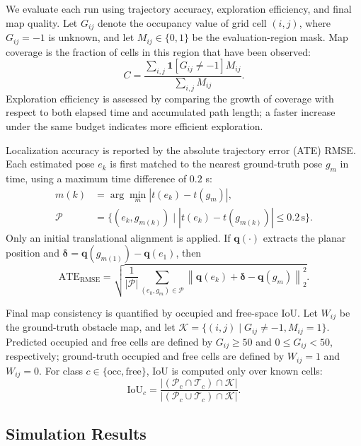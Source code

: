 \documentclass[conference]{IEEEtran}
\begin{document}
We evaluate each run using trajectory accuracy, exploration efficiency, and final map quality.  Let $G_{ij}$ denote the occupancy value of grid cell $(i,j)$, where $G_{ij}=-1$ is unknown, and let $M_{ij}\in\{0,1\}$ be the evaluation-region mask.  Map coverage is the fraction of cells in this region that have been observed:
\begin{equation}
C=\frac{\sum_{i,j}\mathbf{1}[G_{ij}\neq -1]M_{ij}}
        {\sum_{i,j}M_{ij}} .
\end{equation}
Exploration efficiency is assessed by comparing the growth of coverage with respect to both elapsed time and accumulated path length; a faster increase under the same budget indicates more efficient exploration.

Localization accuracy is reported by the absolute trajectory error (ATE) RMSE. Each estimated pose $e_k$ is first matched to the nearest ground-truth pose $g_m$ in time, using a maximum time difference of $0.2$ s:
\begin{equation}
\begin{aligned}
m(k)&=\arg\min_m |t(e_k)-t(g_m)|,\\
\mathcal{P}&=\{(e_k,g_{m(k)})\mid |t(e_k)-t(g_{m(k)})|\leq0.2\,\mathrm{s}\}.
\end{aligned}
\end{equation}
Only an initial translational alignment is applied.  If $\mathbf{q}(\cdot)$ extracts the planar position and $\boldsymbol{\delta}=\mathbf{q}(g_{m(1)})-\mathbf{q}(e_1)$, then
\begin{equation}
\mathrm{ATE}_{\mathrm{RMSE}}=
\sqrt{\frac{1}{|\mathcal{P}|}\sum_{(e_k,g_m)\in\mathcal{P}}
\left\|\mathbf{q}(e_k)+\boldsymbol{\delta}-\mathbf{q}(g_m)\right\|_2^2} .
\end{equation}

Final map consistency is quantified by occupied and free-space IoU.  Let $W_{ij}$ be the ground-truth obstacle map, and let $\mathcal{K}=\{(i,j)\mid G_{ij}\neq -1,M_{ij}=1\}$.  Predicted occupied and free cells are defined by $G_{ij}\geq50$ and $0\leq G_{ij}<50$, respectively; ground-truth occupied and free cells are defined by $W_{ij}=1$ and $W_{ij}=0$.  For class $c\in\{\mathrm{occ},\mathrm{free}\}$, IoU is computed only over known cells:
\begin{equation}
\mathrm{IoU}_{c}=\frac{|(\mathcal{P}_{c}\cap\mathcal{T}_{c})\cap\mathcal{K}|}
{|(\mathcal{P}_{c}\cup\mathcal{T}_{c})\cap\mathcal{K}|} .
\end{equation}

\subsection{Simulation Results}
\end{document}

